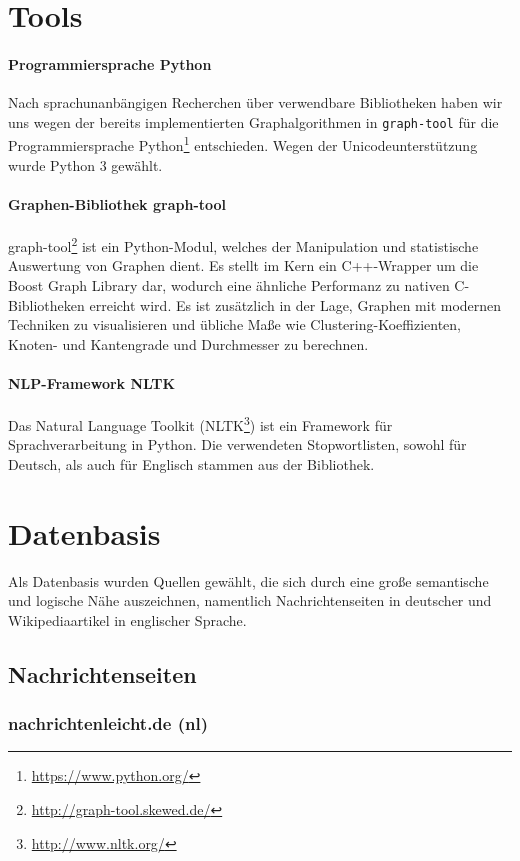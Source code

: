 \documentclass[12pt, a4paper]{article}
\begin{document}
\section{Tools}
\paragraph{Programmiersprache Python}
Nach sprachunanbängigen Recherchen über verwendbare Bibliotheken haben wir uns wegen der bereits implementierten Graphalgorithmen in \texttt{graph-tool} für die Programmiersprache Python\footnote{\url{https://www.python.org/}} entschieden. Wegen der Unicodeunterstützung wurde Python 3 gewählt.

\paragraph{Graphen-Bibliothek graph-tool}
graph-tool\footnote{\url{http://graph-tool.skewed.de/}} ist ein Python-Modul,
welches der Manipulation und statistische
Auswertung von Graphen dient. Es stellt im Kern ein C++-Wrapper um die Boost
Graph Library dar, wodurch eine \"ahnliche Performanz zu nativen C-Bibliotheken
erreicht wird. Es ist zus\"atzlich in der Lage, Graphen mit modernen Techniken
zu visualisieren und \"ubliche Ma\ss{}e wie Clustering-Koeffizienten, Knoten-
und Kantengrade und Durchmesser zu berechnen.

\paragraph{NLP-Framework NLTK}
Das Natural Language Toolkit (NLTK\footnote{\url{http://www.nltk.org/}}) ist ein Framework f\"ur Sprachverarbeitung in Python. Die verwendeten Stopwortlisten, sowohl für Deutsch, als auch für Englisch stammen aus der Bibliothek.

\section{Datenbasis}

Als Datenbasis wurden Quellen gew\"ahlt, die sich durch eine gro\ss{}e
semantische und logische N\"ahe auszeichnen, namentlich Nachrichtenseiten in
deutscher und Wikipediaartikel in englischer Sprache.

\subsection{Nachrichtenseiten}

\subsubsection{nachrichtenleicht.de (nl)}
\end{document}
